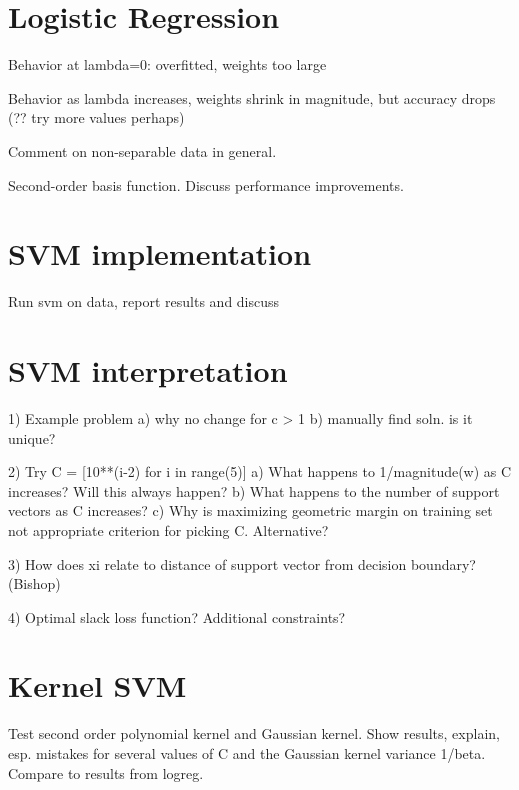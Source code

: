 \documentclass[12pt]{article}
\begin{document}
\maketitle


\section{Logistic Regression}
Behavior at lambda=0: overfitted, weights too large

Behavior as lambda increases, weights shrink in magnitude, but accuracy drops (?? try more values perhaps)

Comment on non-separable data in general.

Second-order basis function. Discuss performance improvements.

\section{SVM implementation}

Run svm on data, report results and discuss

\section{SVM interpretation}

1) Example problem
a) why no change for c > 1
b) manually find soln. is it unique?

2) Try C = [10**(i-2) for i in range(5)]
a) What happens to 1/magnitude(w) as C increases? Will this always happen?
b) What happens to the number of support vectors as C increases?
c) Why is maximizing geometric margin on training set not appropriate criterion for picking C. Alternative?

3) How does xi relate to distance of support vector from decision boundary? (Bishop)

4) Optimal slack loss function? Additional constraints?

\section{Kernel SVM}

Test second order polynomial kernel and Gaussian kernel. Show results, explain, esp. mistakes for several values of C and the Gaussian kernel variance 1/beta. Compare to results from logreg.
\end{document}
